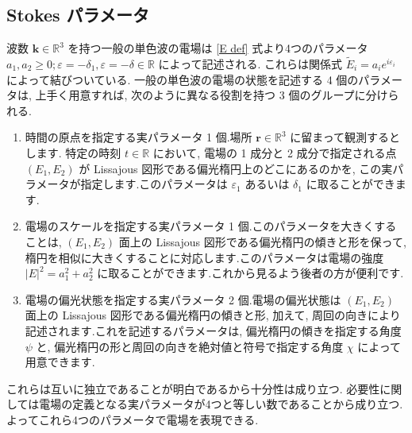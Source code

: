\documentclass[uplatex,dvipdfmx,a4paper,11pt]{jlreq}
\newcommand{\RR}{\mathbb{R}}
\newcommand{\rr}{\bm{r}}
\newcommand{\kk}{\bm{k}}
\theoremstyle{definition}
\begin{document}
\subsection{Stokes パラメータ}
波数 $\kk\in\RR^3$ を持つ一般の単色波の電場は \eqref{E def} 式より4つのパラメータ $a_1, a_2 \geq 0; \varepsilon = -\delta_1, \varepsilon = -\delta\in\RR$ によって記述される. これらは関係式 $\tilde{E}_i = a_ie^{i \varepsilon_i}$ によって結びついている. 一般の単色波の電場の状態を記述する 4 個のパラメータは, 上手く用意すれば, 次のように異なる役割を持つ 3 個のグループに分けられる.

\begin{enumerate}
  \item 時間の原点を指定する実パラメータ 1 個.場所 $\rr\in\RR^3$ に留まって観測するとします. 特定の時刻 $t\in\RR$ において, 電場の 1 成分と 2 成分で指定される点 $(E_1, E_2)$ が Lissajous 図形である偏光楕円上のどこにあるのかを, この実パラメータが指定します.このパラメータは $\varepsilon_1$ あるいは $\delta_1$ に取ることができます.
  \item 電場のスケールを指定する実パラメータ 1 個.このパラメータを大きくすることは, $(E_1, E_2)$ 面上の Lissajous 図形である偏光楕円の傾きと形を保って, 楕円を相似に大きくすることに対応します.このパラメータは電場の強度 $|E|^2 = a_1^2 + a_2^2$ に取ることができます.これから見るよう後者の方が便利です.
  \item 電場の偏光状態を指定する実パラメータ 2 個.電場の偏光状態は $(E_1, E_2)$ 面上の Lissajous 図形である偏光楕円の傾きと形, 加えて, 周回の向きにより記述されます.これを記述するパラメータは, 偏光楕円の傾きを指定する角度 $\psi$ と, 偏光楕円の形と周回の向きを絶対値と符号で指定する角度 $\chi$ によって用意できます.
\end{enumerate}

これらは互いに独立であることが明白であるから十分性は成り立つ. 必要性に関しては電場の定義となる実パラメータが4つと等しい数であることから成り立つ. よってこれら4つのパラメータで電場を表現できる.
\end{document}

